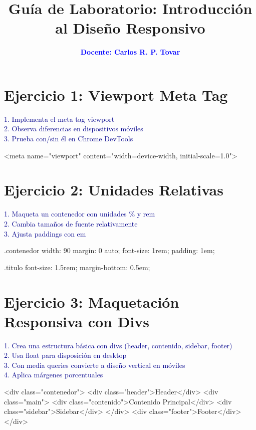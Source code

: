 \documentclass[12pt, a4paper]{article}
\title{\textbf{Guía de Laboratorio: Introducción al Diseño Responsivo}}
\author{\textcolor{blue}{\textbf{Docente: Carlos R. P. Tovar}}}
\date{}
\newcommand{\enunciado}[1]{
    \vspace{0.5em}
    \noindent\colorbox{blue!10}{
        \parbox{\dimexpr\textwidth-2\fboxsep}{
            \small\sffamily\textcolor{darkblue}{#1}
        }
    }
    \vspace{0.5em}
}
\begin{document}
\maketitle
\thispagestyle{empty}



\section*{Ejercicio 1: Viewport Meta Tag}
\enunciado{
    1. Implementa el meta tag viewport \\
    2. Observa diferencias en dispositivos móviles \\
    3. Prueba con/sin él en Chrome DevTools
}

\begin{codebox}[title=HTML]
<meta name="viewport" content="width=device-width, initial-scale=1.0">
\end{codebox}

\section*{Ejercicio 2: Unidades Relativas}
\enunciado{
    1. Maqueta un contenedor con unidades \% y rem \\
    2. Cambia tamaños de fuente relativamente \\
    3. Ajusta paddings con em
}

\begin{codebox}[title=CSS]
.contenedor {
    width: 90%
    margin: 0 auto;
    font-size: 1rem;
    padding: 1em;
}

.titulo {
    font-size: 1.5rem;
    margin-bottom: 0.5em;
}
\end{codebox}

\section*{Ejercicio 3: Maquetación Responsiva con Divs}
\enunciado{
    1. Crea una estructura básica con divs (header, contenido, sidebar, footer) \\
    2. Usa float para disposición en desktop \\
    3. Con media queries convierte a diseño vertical en móviles \\
    4. Aplica márgenes porcentuales
}

\begin{codebox}[title=HTML]
<div class="contenedor">
    <div class="header">Header</div>
    <div class="main">
        <div class="contenido">Contenido Principal</div>
        <div class="sidebar">Sidebar</div>
    </div>
    <div class="footer">Footer</div>
</div>
\end{codebox}
\end{document}
